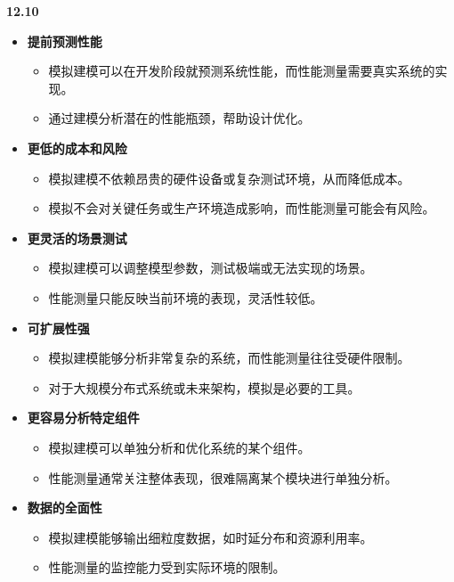 \documentclass[UTF8]{report}
\begin{document}
\noindent
\textbf{12.10}

\begin{itemize}
    \item \textbf{提前预测性能}
    \begin{itemize}
        \item 模拟建模可以在开发阶段就预测系统性能，而性能测量需要真实系统的实现。
        \item 通过建模分析潜在的性能瓶颈，帮助设计优化。
    \end{itemize}

    \item \textbf{更低的成本和风险}
    \begin{itemize}
        \item 模拟建模不依赖昂贵的硬件设备或复杂测试环境，从而降低成本。
        \item 模拟不会对关键任务或生产环境造成影响，而性能测量可能会有风险。
    \end{itemize}

    \item \textbf{更灵活的场景测试}
    \begin{itemize}
        \item 模拟建模可以调整模型参数，测试极端或无法实现的场景。
        \item 性能测量只能反映当前环境的表现，灵活性较低。
    \end{itemize}

    \item \textbf{可扩展性强}
    \begin{itemize}
        \item 模拟建模能够分析非常复杂的系统，而性能测量往往受硬件限制。
        \item 对于大规模分布式系统或未来架构，模拟是必要的工具。
    \end{itemize}

    \item \textbf{更容易分析特定组件}
    \begin{itemize}
        \item 模拟建模可以单独分析和优化系统的某个组件。
        \item 性能测量通常关注整体表现，很难隔离某个模块进行单独分析。
    \end{itemize}

    \item \textbf{数据的全面性}
    \begin{itemize}
        \item 模拟建模能够输出细粒度数据，如时延分布和资源利用率。
        \item 性能测量的监控能力受到实际环境的限制。
    \end{itemize}
\end{itemize}
\end{document}
